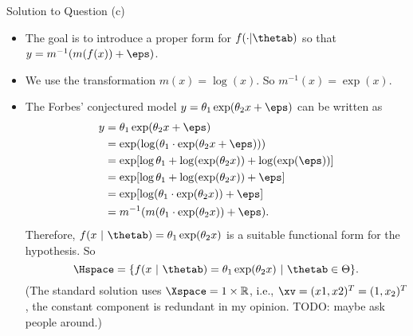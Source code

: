 \documentclass[aspectratio=169]{beamer}
\begin{document}
\begin{frame}{Solution to Question (c)}
	\small
	\begin{itemize}
		\item The goal is to introduce a proper form for $f(\cdot | \thetab)$ so that $y = m^{-1}(m(f(x)) + \eps)$.
		\item We use the transformation $m(x) = \log(x)$. So $m^{-1}(x) = \exp(x)$. 
		\item The Forbes' conjectured model $y = \theta_1 \exp(\theta_2 x + \eps)$ can be written as 
			\begin{align*}
				y &= \theta_1 \exp(\theta_2 x + \eps) \\
				&= \exp(\log(\theta_1 \cdot \exp(\theta_2 x + \eps))) \\
				&= \exp[\log \theta_1 + \log(\exp(\theta_2 x)) + \log (\exp(\eps))] \\
				&= \exp[\log \theta_1 + \log(\exp(\theta_2 x)) + \eps] \\
				&= \exp[\log (\theta_1 \cdot \exp(\theta_2 x)) + \eps] \\
				&= m^{-1}(m(\theta_1 \cdot \exp(\theta_2 x)) + \eps).
			\end{align*}
			Therefore, $f(x \ | \ \thetab) = \theta_1 \exp(\theta_2 x)$ is a suitable functional form for the hypothesis. So 
			$$\Hspace = \{ f(x \ | \ \thetab) = \theta_1 \exp(\theta_2 x) \ | \ \thetab \in \Theta \}.$$
			(The standard solution uses $\Xspace = {1} \times \mathbb{R}$, i.e., $\xv = (x1, x2)^T = (1, x_2)^T$, the constant component is redundant in my opinion. TODO: maybe ask people around.)
	\end{itemize}

	
	
\end{frame}
\end{document}
